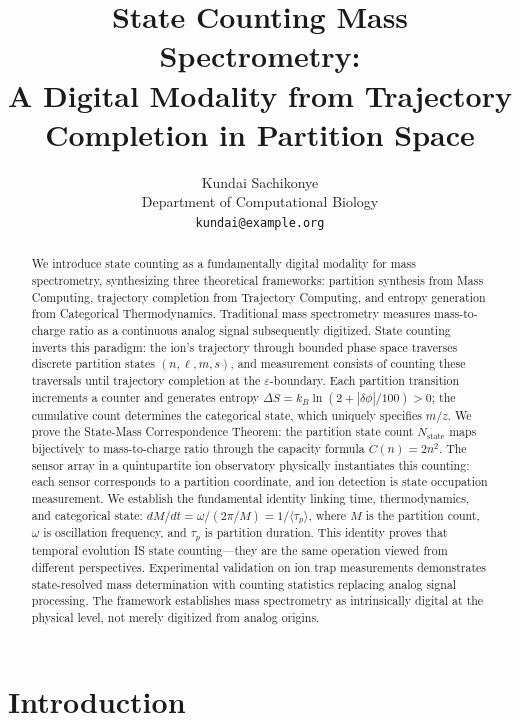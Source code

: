 \documentclass[twocolumn,10pt]{article}
\title{State Counting Mass Spectrometry: \\
A Digital Modality from Trajectory Completion in Partition Space}
\author{
Kundai Sachikonye\\
\small Department of Computational Biology\\
\small \texttt{kundai@example.org}
}
\date{}
\newcommand{\eps}{\varepsilon}
\begin{document}
\maketitle

\begin{abstract}
We introduce state counting as a fundamentally digital modality for mass spectrometry, synthesizing three theoretical frameworks: partition synthesis from Mass Computing, trajectory completion from Trajectory Computing, and entropy generation from Categorical Thermodynamics. Traditional mass spectrometry measures mass-to-charge ratio as a continuous analog signal subsequently digitized. State counting inverts this paradigm: the ion's trajectory through bounded phase space traverses discrete partition states $(n, \ell, m, s)$, and measurement consists of counting these traversals until trajectory completion at the $\eps$-boundary. Each partition transition increments a counter and generates entropy $\Delta S = k_B \ln(2 + |\delta\phi|/100) > 0$; the cumulative count determines the categorical state, which uniquely specifies $m/z$. We prove the State-Mass Correspondence Theorem: the partition state count $N_{\text{state}}$ maps bijectively to mass-to-charge ratio through the capacity formula $C(n) = 2n^2$. The sensor array in a quintupartite ion observatory physically instantiates this counting: each sensor corresponds to a partition coordinate, and ion detection is state occupation measurement. We establish the fundamental identity linking time, thermodynamics, and categorical state: $dM/dt = \omega/(2\pi/M) = 1/\langle\tau_p\rangle$, where $M$ is the partition count, $\omega$ is oscillation frequency, and $\tau_p$ is partition duration. This identity proves that temporal evolution IS state counting---they are the same operation viewed from different perspectives. Experimental validation on ion trap measurements demonstrates state-resolved mass determination with counting statistics replacing analog signal processing. The framework establishes mass spectrometry as intrinsically digital at the physical level, not merely digitized from analog origins.
\end{abstract}

\section{Introduction}
\end{document}

